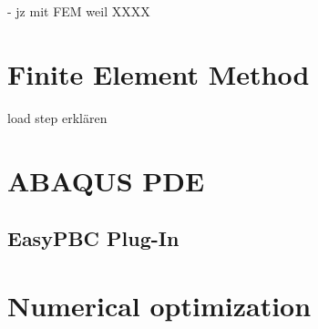 



- jz mit FEM weil XXXX


\section{Finite Element Method} \label{sec: FEMBasics}

load step erklären
\section{ABAQUS PDE}
\subsection{EasyPBC Plug-In}



\section{Numerical optimization} \label{sec: optimizationBasics}

